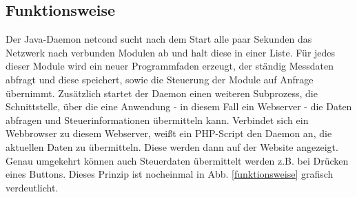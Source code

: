 \documentclass[a4paper,14pt,headsepline]{scrartcl}
\begin{document}
\newpage

\subsection{Funktionsweise}

\begin{figure}[h]
\begin{center}
\end{center}
\end{figure}

Der Java-Daemon netcond sucht nach dem Start alle paar Sekunden das Netzwerk nach verbunden Modulen ab und halt diese in einer Liste. Für jedes dieser Module wird ein neuer Programmfaden erzeugt, der ständig Messdaten abfragt und diese speichert, sowie die Steuerung der Module auf Anfrage übernimmt. Zusätzlich startet der Daemon einen weiteren Subprozess, die Schnittstelle, über die eine Anwendung - in diesem Fall ein Webserver - die Daten abfragen und Steuerinformationen übermitteln kann. Verbindet sich ein Webbrowser zu diesem Webserver, weißt ein PHP-Script den Daemon an, die aktuellen Daten zu übermitteln. Diese werden dann auf der Website angezeigt. Genau umgekehrt können auch Steuerdaten übermittelt werden z.B. bei Drücken eines Buttons. Dieses Prinzip ist nocheinmal in Abb. \ref{funktionsweise} grafisch verdeutlicht.

\newpage
\end{document}
